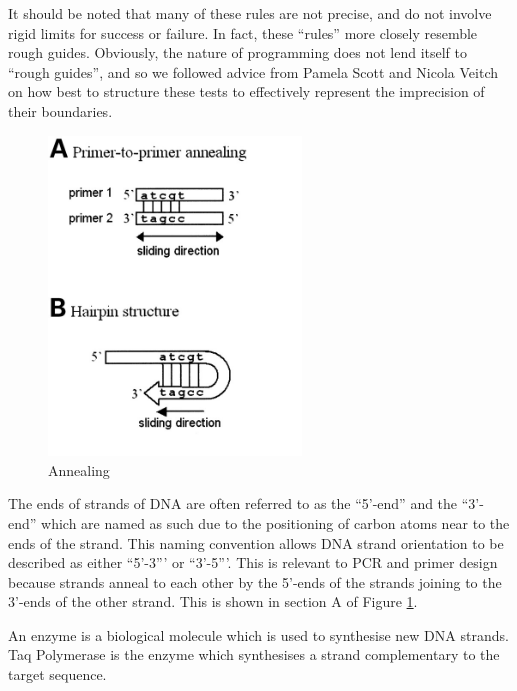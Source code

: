 It should be noted that many of these rules are not precise, and do
not involve rigid limits for success or failure.
In fact, these ``rules'' more closely resemble rough guides.
Obviously, the nature of programming does not lend itself to ``rough
guides'', and so we followed advice from Pamela Scott and Nicola
Veitch on how best to structure these tests to effectively represent
the imprecision of their boundaries.

\begin{figure}[!t]
  \begin{center}
    \includegraphics[width=0.6\textwidth]{./images/other/annealing.jpg}
    \caption{
      \label{fig:other:anneal}
      Annealing	
    }
  \end{center}
\end{figure}

The ends of strands of DNA are often referred to as the ``5'-end'' and
the ``3'-end'' which are named as such due to the positioning of carbon
atoms near to the ends of the strand. This naming convention allows DNA
strand orientation to be described as either ``5'-3''' or ``3'-5'''.
This is relevant to PCR and primer design because strands anneal to
each other by the 5'-ends of the strands joining to the 3'-ends of the
other strand. This is shown in section A of Figure
\ref{fig:other:anneal}.

An enzyme is a biological molecule which is used to synthesise new DNA
strands. Taq Polymerase is the enzyme which synthesises a strand
complementary to the target sequence.










